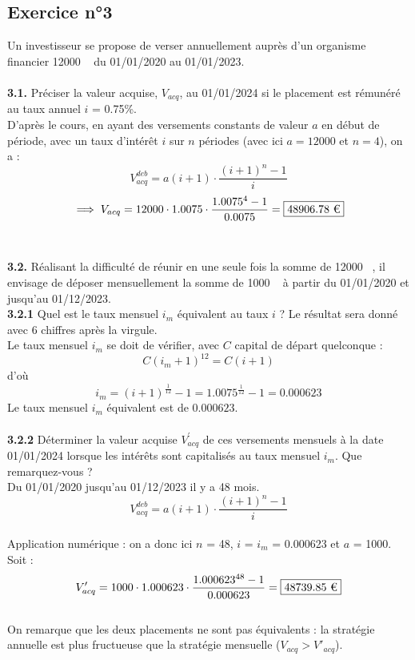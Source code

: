 \documentclass{article}
\begin{document}
\subsection{Exercice n°3}
\textcolor{exogris}{
Un investisseur se propose de verser annuellement auprès d’un organisme financier 12000 \texteuro  du 01/01/2020 au 01/01/2023.
}
\\\\ \textcolor{exogris}{\textbf{3.1.}
Préciser la valeur acquise, $V_{acq}$, au 01/01/2024 si le placement est rémunéré au taux annuel $i$ = 0.75\%.
}
\\%
D'après le cours, en ayant des versements constants de valeur $a$ en début de période, avec un taux d'intérêt $i$ sur $n$ périodes (avec ici $a = 12000$ et $n = 4$), on a :
$$V^{deb}_{acq} = a(i+1)\cdot\dfrac{(i+1)^n-1}{i}$$
$$\implies V_{acq} = 12000\cdot  1.0075\cdot\dfrac{1.0075^4-1}{0.0075} = \boxed{48906.78\text{ \texteuro}}$$
\\%
\\%
\textcolor{exogris}{\textbf{3.2.}
Réalisant la difficulté de réunir en une seule fois la somme de 12000 \texteuro , il envisage de déposer mensuellement la somme de 1000 \texteuro  à partir du 01/01/2020 et jusqu’au 01/12/2023.
}
\\%
\textcolor{exogris}{\textbf{3.2.1}
Quel est le taux mensuel $i_m$ équivalent au taux $i$ ? Le résultat sera donné avec 6 chiffres après la virgule.
}%
\\%
Le taux mensuel $i_m$ se doit de vérifier, avec $C$ capital de départ quelconque :
$$C(i_m + 1)^{12} = C(i+1)$$
d'où
$$\boxed{i_m = (i+1)^{\frac{1}{12}} - 1} = 1.0075^{\frac{1}{12}}-1 = \boxed{0.000623}$$
Le taux mensuel $i_m$ équivalent est de $0.000623$.
\\%
\\%
\textcolor{exogris}{\textbf{3.2.2}
Déterminer la valeur acquise $V^{'}_{acq}$ de ces versements mensuels à la date 01/01/2024 lorsque les intérêts sont capitalisés au taux mensuel $i_m$. Que remarquez-vous ?
}%
\\%
Du 01/01/2020 jusqu'au 01/12/2023 il y a 48 mois.
$$V^{deb}_{acq} = a(i+1)\cdot\dfrac{(i+1)^n-1}{i}$$
\\Application numérique : on a donc ici $n$ = 48, $i$ = $i_m$ = 0.000623 et $a$ = 1000.
Soit :
$$V'_{acq} = 1000 \cdot 1.000623\cdot\dfrac{1.000623^{48}-1}{0.000623} = \boxed{48739.85\text{ \texteuro}}$$
\\On remarque que les deux placements ne sont pas équivalents : la stratégie annuelle est plus fructueuse que la stratégie mensuelle ($V_{acq} > V'_{acq}$).
\end{document}
